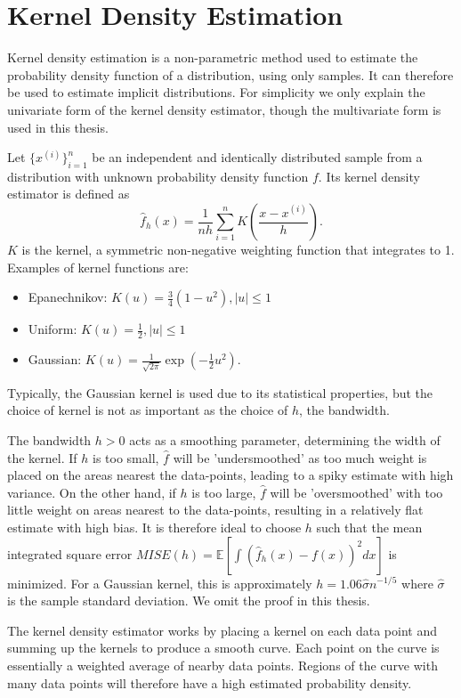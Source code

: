 \documentclass[honours,12pt]{unswthesis}
\newcommand{\E}{\mathbb{E}}
\numberwithin{equation}{section}
\theoremstyle{definition}
\begin{document}
\clearpage
{}





\newpage
\appendix
\chapter{Kernel Density Estimation}
Kernel density estimation is a non-parametric method used to estimate the probability density function of a distribution, using only samples. It can therefore be used to estimate implicit distributions. For simplicity we only explain the univariate form of the kernel density estimator, though the multivariate form is used in this thesis.

Let $\{x^{(i)}\}^n_{i=1}$ be an independent and identically distributed sample from a distribution with unknown probability density function $f$. Its kernel density estimator is defined as
\[\hat{f}_h(x)=\frac{1}{nh}\sum^n_{i=1}K\left(\frac{x-x^{(i)}}{h}\right).\]
$K$ is the kernel, a symmetric non-negative weighting function that integrates to 1. Examples of kernel functions are:
\begin{itemize}
\item Epanechnikov: $K(u)=\frac{3}{4}(1-u^2), |u|\leq 1$
\item Uniform: $K(u)=\frac12, |u|\leq 1$
\item Gaussian: $K(u)=\frac{1}{\sqrt{2\pi}}\exp\left(-\frac{1}{2}u^2\right)$.
\end{itemize}
Typically, the Gaussian kernel is used due to its statistical properties, but the choice of kernel is not as important as the choice of $h$, the bandwidth.

The bandwidth $h>0$ acts as a smoothing parameter, determining the width of the kernel. If $h$ is too small, $\hat{f}$ will be 'undersmoothed' as too much weight is placed on the areas nearest the data-points, leading to a spiky estimate with high variance. On the other hand, if $h$ is too large, $\hat{f}$ will be 'oversmoothed' with too little weight on areas nearest to the data-points, resulting in a relatively flat estimate with high bias. It is therefore ideal to choose $h$ such that the mean integrated square error $MISE(h)=\E\left[\int(\hat{f}_h(x)-f(x))^2dx\right]$ is minimized. For a Gaussian kernel, this is approximately $h=1.06\hat{\sigma}n^{-1/5}$ where $\hat{\sigma}$ is the sample standard deviation. We omit the proof in this thesis.

The kernel density estimator works by placing a kernel on each data point and summing up the kernels to produce a smooth curve. Each point on the curve is essentially a weighted average of nearby data points. Regions of the curve with many data points will therefore have a high estimated probability density.
\end{document}
